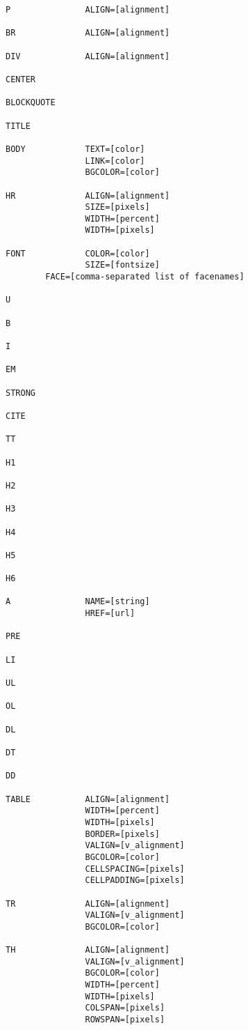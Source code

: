 \begin{verbatim}
P               ALIGN=[alignment]

BR              ALIGN=[alignment]

DIV             ALIGN=[alignment]

CENTER

BLOCKQUOTE

TITLE

BODY            TEXT=[color]
                LINK=[color]
                BGCOLOR=[color]
                
HR              ALIGN=[alignment]
                SIZE=[pixels]
                WIDTH=[percent]
                WIDTH=[pixels]
                
FONT            COLOR=[color]
                SIZE=[fontsize]
		FACE=[comma-separated list of facenames]
                
U

B

I

EM

STRONG

CITE

TT

H1

H2

H3

H4

H5

H6

A               NAME=[string]
                HREF=[url]

PRE

LI

UL

OL

DL

DT

DD

TABLE           ALIGN=[alignment]
                WIDTH=[percent]
                WIDTH=[pixels]
                BORDER=[pixels]
                VALIGN=[v_alignment]
                BGCOLOR=[color]
                CELLSPACING=[pixels]
                CELLPADDING=[pixels]

TR              ALIGN=[alignment]
                VALIGN=[v_alignment]
                BGCOLOR=[color]
                
TH              ALIGN=[alignment]
                VALIGN=[v_alignment]
                BGCOLOR=[color]
                WIDTH=[percent]
                WIDTH=[pixels]
                COLSPAN=[pixels]
                ROWSPAN=[pixels]
                

\end{verbatim}
